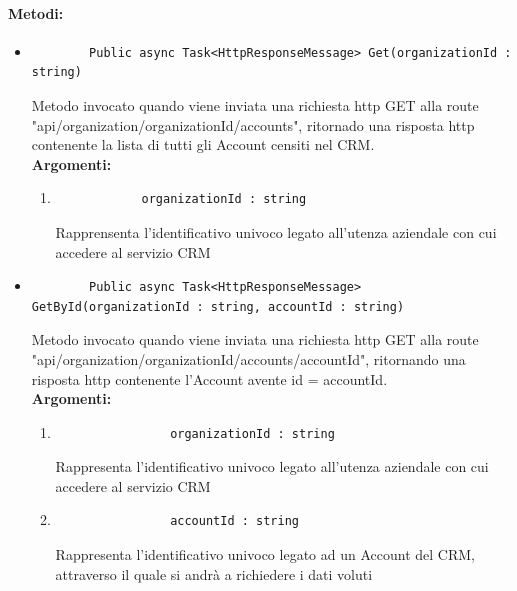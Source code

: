 \paragraph{Metodi:}\hfill
\begin{itemize}
	\itemsep0em 
	\item 
		\begin{lstlisting}
		Public async Task<HttpResponseMessage> Get(organizationId : string)
		\end{lstlisting}
		Metodo invocato quando viene inviata una richiesta http GET alla route "api/organization/{organizationId}/accounts", ritornado una risposta http contenente la lista di tutti gli Account censiti nel CRM.\\
		\textbf{\small Argomenti:}
		\begin{enumerate}[leftmargin=*]
			\itemsep0em 
			\item \begin{lstlisting}
			organizationId : string 
			\end{lstlisting}
			Rapprensenta l'identificativo univoco legato all'utenza aziendale con cui accedere al servizio CRM
		\end{enumerate}
		
	\item 
		\begin{lstlisting}
		Public async Task<HttpResponseMessage> GetById(organizationId : string, accountId : string)
		\end{lstlisting}
		Metodo invocato quando viene inviata una richiesta http GET alla route "api/organization/{organizationId}/accounts/{accountId}", ritornando una risposta http contenente l'Account avente id = {accountId}.\\
		\textbf{\small Argomenti:}
		\begin{enumerate}[leftmargin=*]
			\itemsep0em 
			\item 
				\begin{lstlisting}
				organizationId : string 
				\end{lstlisting}
				Rappresenta l'identificativo univoco legato all'utenza aziendale con cui accedere al servizio CRM
			\item 
				\begin{lstlisting}
				accountId : string
				\end{lstlisting}
				Rappresenta l'identificativo univoco legato ad un Account del CRM, attraverso il quale si andrà a richiedere i dati voluti
		\end{enumerate}
\end{itemize}

